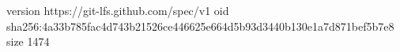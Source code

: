 version https://git-lfs.github.com/spec/v1
oid sha256:4a33b785fac4d743b21526ce446625e664d5b93d3440b130e1a7d871bef5b7e8
size 1474

